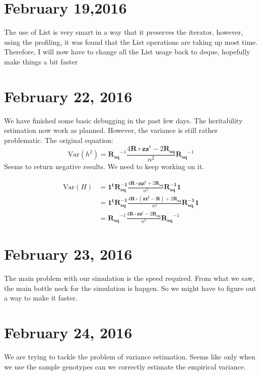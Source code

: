 \documentclass[12pt]{article}
\begin{document}
	\section{February 19,2016}
	The use of List is very smart in a way that it preserves the iterator, however, using the profiling, it was found that the List operations are taking up most time. 
	Therefore, I will now have to change all the List usage back to deque, hopefully make things a bit faster
	
	\section{February 22, 2016}
	We have finished some basic debugging in the past few days.
	The heritability estimation now work as planned.
	However, the variance is still rather problematic.
	The original equation:
	\begin{equation}
	\mathrm{Var}(h^2)=\boldsymbol{R_{sq}}^{-1}\frac{4\boldsymbol{R}\circ\boldsymbol{zz}^t-2\boldsymbol{R_{sq}}}{n^2}\boldsymbol{R_{sq}}^{-1}
	\end{equation}
	Seems to return negative results. 
	We need to keep working on it.
	
	\begin{align}
	\mathrm{Var}(H) &= \boldsymbol{1^tR_{sq}^{-1}}\frac{4\boldsymbol{R}\circ\boldsymbol{\mu\mu^t}+2\boldsymbol{R_{sq}}}{n^2}\boldsymbol{R_{sq}^{-1}1}\nonumber\\
	&=\boldsymbol{1^tR_{sq}^{-1}}\frac{4\boldsymbol{R}\circ(\boldsymbol{zz^t-R})+2\boldsymbol{R_{sq}}}{n^2}\boldsymbol{R_{sq}^{-1}1} \nonumber\\
	&=\boldsymbol{R_{sq}}^{-1}\frac{4\boldsymbol{R}\circ\boldsymbol{zz}^t-2\boldsymbol{R_{sq}}}{n^2}\boldsymbol{R_{sq}}^{-1}
	\end{align}
	\section{February 23, 2016}
	The main problem with our simulation is the speed required. 
	From what we saw, the main bottle neck for the simulation is hapgen.
	So we might have to figure out a way to make it faster.
	
	\section{February 24, 2016}
	We are trying to tackle the problem of variance estimation.
	Seems like only when we use the sample genotypes can we correctly estimate the empirical variance.
\end{document}
